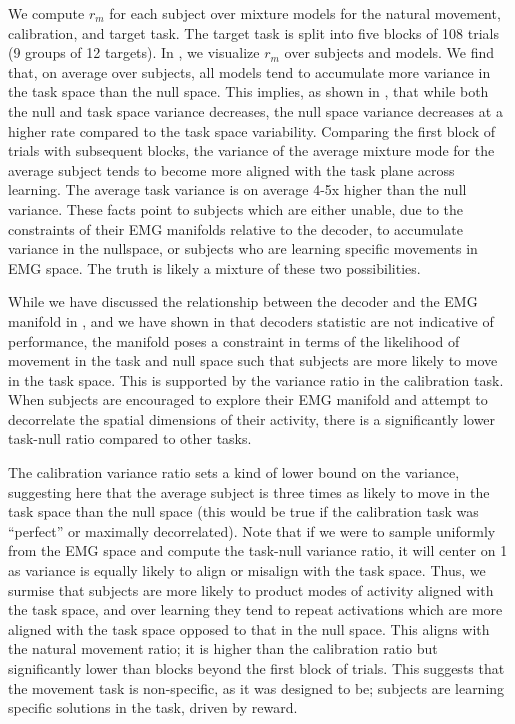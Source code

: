 \documentclass[../main.tex]{subfiles}
\begin{document}
  We compute $r_m$ for each subject over mixture models for the natural movement, calibration, and target task. The target task is split into five blocks of 108 trials (9 groups of 12 targets). In , we visualize $r_m$ over subjects and models. We find that, on average over subjects, all models tend to accumulate more variance in the task space than the null space. This implies, as shown in , that while both the null and task space variance decreases, the null space variance decreases at a higher rate compared to the task space variability. Comparing the first block of trials with subsequent blocks, the variance of the average mixture mode for the average subject tends to become more aligned with the task plane across learning. The average task variance is on average 4-5x higher than the null variance. These facts point to subjects which are either unable, due to the constraints of their EMG manifolds relative to the decoder, to accumulate variance in the nullspace, or subjects who are learning specific movements in EMG space. The truth is likely a mixture of these two possibilities. 
  
  While we have discussed the relationship between the decoder and the EMG manifold in , and we have shown in  that decoders statistic are not indicative of performance, the manifold poses a constraint in terms of the likelihood of movement in the task and null space such that subjects are more likely to move in the task space. This is supported by the variance ratio in the calibration task. When subjects are encouraged to explore their EMG manifold and attempt to decorrelate the spatial dimensions of their activity, there is a significantly lower task-null ratio compared to other tasks.
  
  The calibration variance ratio sets a kind of lower bound on the variance, suggesting here that the average subject is three times as likely to move in the task space than the null space (this would be true if the calibration task was ``perfect'' or maximally decorrelated). Note that if we were to sample uniformly from the EMG space and compute the task-null variance ratio, it will center on 1 as variance is equally likely to align or misalign with the task space. Thus, we surmise that subjects are more likely to product modes of activity aligned with the task space, and over learning they tend to repeat activations which are more aligned with the task space opposed to that in the null space. This aligns with the natural movement ratio; it is higher than the calibration ratio but significantly lower than blocks beyond the first block of trials. This suggests that the movement task is non-specific, as it was designed to be; subjects are learning specific solutions in the task, driven by reward.
  
\end{document}
